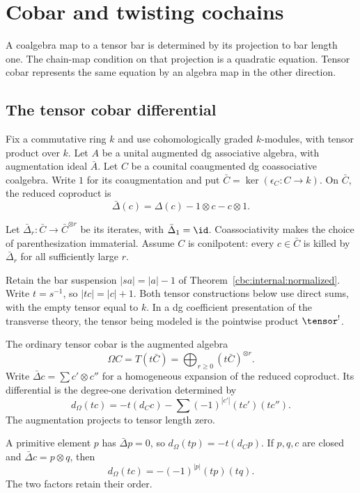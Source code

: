 \chapter{Cobar and twisting cochains}
A coalgebra map to a tensor bar is determined by its projection to bar length one.
The chain-map condition on that projection is a quadratic equation.
Tensor cobar represents the same equation by an algebra map in the other direction.

\section{The tensor cobar differential}
Fix a commutative ring $k$ and use cohomologically graded $k$-modules, with tensor product over $k$.
Let $A$ be a unital augmented dg associative algebra, with augmentation ideal $\bar A$.
Let $C$ be a counital coaugmented dg coassociative coalgebra.
Write $1$ for its coaugmentation and put $\bar C=\ker(\epsilon_C:C\to k)$.
On $\bar C$, the reduced coproduct is
\[
 \bar\Delta(c)=\Delta(c)-1\otimes c-c\otimes1.
\]

Let $\bar\Delta_r:\bar C\to\bar C^{\otimes r}$ be its iterates, with $\bar\Delta_1=\id$.
Coassociativity makes the choice of parenthesization immaterial.
Assume $C$ is conilpotent: every $c\in\bar C$ is killed by $\bar\Delta_r$ for all sufficiently large $r$.

Retain the bar suspension $|sa|=|a|-1$ of Theorem~\ref{cbc:internal:normalized}.
Write $t=s^{-1}$, so $|tc|=|c|+1$.
Both tensor constructions below use direct sums, with the empty tensor equal to $k$.
In a dg coefficient presentation of the transverse theory, the tensor being modeled is the pointwise product $\tensor^!$.

\begin{definition}\label{cbc:cobar:definition}
The ordinary tensor cobar is the augmented algebra
\[
 \Omega C=T(t\bar C)=\bigoplus_{r\geq0}(t\bar C)^{\otimes r}.
\]
Write $\bar\Delta c=\sum c'\otimes c''$ for a homogeneous expansion of the reduced coproduct.
Its differential is the degree-one derivation determined by
\begin{equation}\label{eq:cbc:cobar:differential}
 d_\Omega(tc)=-t(d_Cc)
       -\sum(-1)^{|c'|}(tc')(tc'').
\end{equation}
The augmentation projects to tensor length zero.
\end{definition}

A primitive element $p$ has $\bar\Delta p=0$, so $d_\Omega(tp)=-t(d_Cp)$.
If $p,q,c$ are closed and $\bar\Delta c=p\otimes q$, then
\[
 d_\Omega(tc)=-(-1)^{|p|}(tp)(tq).
\]
The two factors retain their order.

